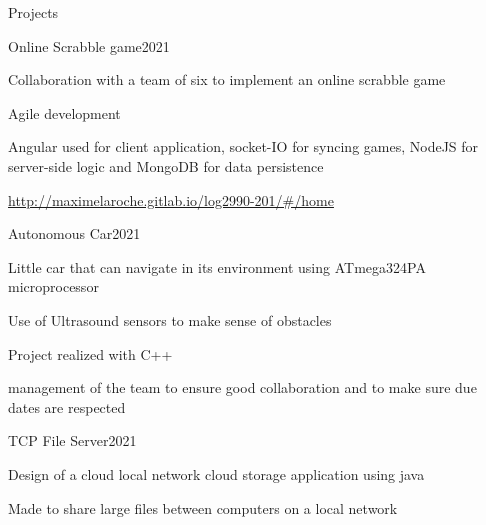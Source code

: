 \documentclass{resume} %
\begin{document}
	\begin{rSection}{Projects}
		\begin{rSubsection}{Online Scrabble game}{2021}{}{}
			\item Collaboration with a team of six to implement an online scrabble game
			\item Agile development
			\item Angular used for client application, socket-IO for syncing games, NodeJS for server-side logic and MongoDB for data persistence
			\item \url{http://maximelaroche.gitlab.io/log2990-201/#/home}
		 \end{rSubsection}
		\begin{rSubsection}{Autonomous Car}{2021}{}{}
			\item Little car that can navigate in its environment using ATmega324PA microprocessor
			\item Use of Ultrasound sensors to make sense of obstacles
			\item Project realized with C++
			\item management of the team to ensure good collaboration and to make sure due dates are respected
		 \end{rSubsection}

		 \begin{rSubsection}{TCP File Server}{2021}{}{}
			\item Design of a cloud local network cloud storage application using java
			\item Made to share large files between computers on a local network
		\end{rSubsection}

		

\end{rSection}
\end{document}
